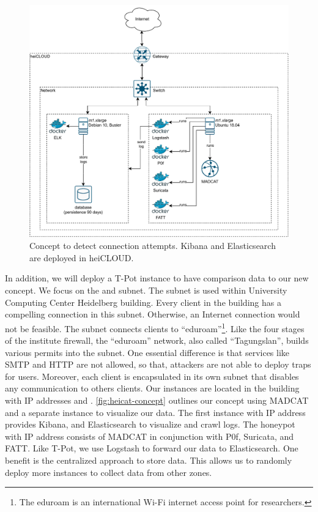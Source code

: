 \begin{figure}
    \centering
    \includegraphics[width=\textwidth]{figures/heicat-conecpt.pdf}
    \caption[Concept to detect connection attempts]{Concept to detect connection attempts. Kibana and Elasticsearch are deployed in heiCLOUD.}
    \label{fig:heicat-concept}
\end{figure}

In addition, we will deploy a T-Pot instance to have comparison data to our new concept.
We focus on the  and  subnet.
The  subnet is used within University Computing Center Heidelberg building.
Every client in the building has a compelling connection in this subnet.
Otherwise, an Internet connection would not be feasible.
The subnet  connects clients to \enquote{eduroam}\footnote{The eduroam is an international Wi-Fi internet access point for researchers.}.
Like the four stages of the institute firewall, the \enquote{eduroam} network, also called \enquote{Tagungslan}, builds various permits into the subnet.
One essential difference is that services like SMTP and HTTP are not allowed, so that, attackers are not able to deploy traps for users.
Moreover, each client is encapsulated in its own subnet that disables any communication to others clients.
Our instances are located in the building with IP addresses  and .
\autoref{fig:heicat-concept} outlines our concept using MADCAT and a separate instance to visualize our data.
The first instance with IP address  provides Kibana, and Elasticsearch to visualize and crawl logs.
The honeypot with IP address  consists of MADCAT in conjunction with P0f, Suricata, and FATT.
Like T-Pot, we use Logstash to forward our data to Elasticsearch.
One benefit is the centralized approach to store data.
This allows us to randomly deploy more instances to collect data from other zones.

